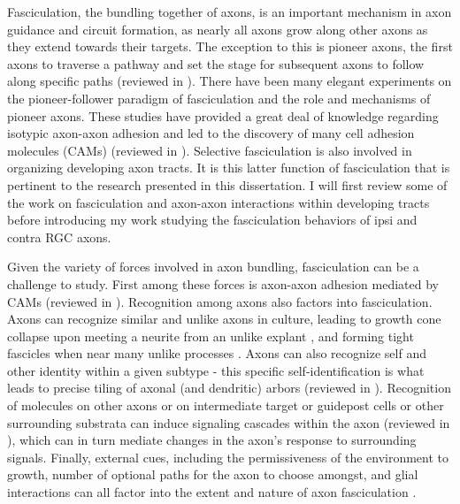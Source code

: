 Fasciculation, the bundling together of axons, is an important mechanism in axon guidance and circuit formation, as nearly all axons grow along other axons as they extend towards their targets.
The exception to this is pioneer axons, the first axons to traverse a pathway and set the stage for subsequent axons to follow along specific paths (reviewed in ).
There have been many elegant experiments on the pioneer-follower paradigm of fasciculation and the role and mechanisms of pioneer axons.
These studies have provided a great deal of knowledge regarding isotypic axon-axon adhesion and led to the discovery of many cell adhesion molecules (CAMs) (reviewed in ).
Selective fasciculation is also involved in organizing developing axon tracts.
It is this latter function of fasciculation that is pertinent to the research presented in this dissertation.
I will first review some of the work on fasciculation and axon-axon interactions within developing tracts before introducing my work studying the fasciculation behaviors of ipsi and contra RGC axons.

Given the variety of forces involved in axon bundling, fasciculation can be a challenge to study.
First among these forces is axon-axon adhesion mediated by CAMs (reviewed in \cite{van1998adhesion,wang2013axons}).
Recognition among axons also factors into fasciculation.
Axons can recognize similar and unlike axons in culture, leading to growth cone collapse upon meeting a neurite from an unlike explant \cite{fan1995localized,raper1990temporal}, and forming tight fascicles when near many unlike processes \cite{kapfhammer1986selective}.
Axons can also recognize self and other identity within a given subtype - this specific self-identification is what leads to precise tiling of axonal (and dendritic) arbors (reviewed in ).
Recognition of molecules on other axons or on intermediate target or guidepost cells or other surrounding substrata can induce signaling cascades within the axon (reviewed in ), which can in turn mediate changes in the axon's response to surrounding signals.
Finally, external cues, including the permissiveness of the environment to growth, number of optional paths for the axon to choose amongst, and glial interactions can all factor into the extent and nature of axon fasciculation \cite{wang2013axons}.

